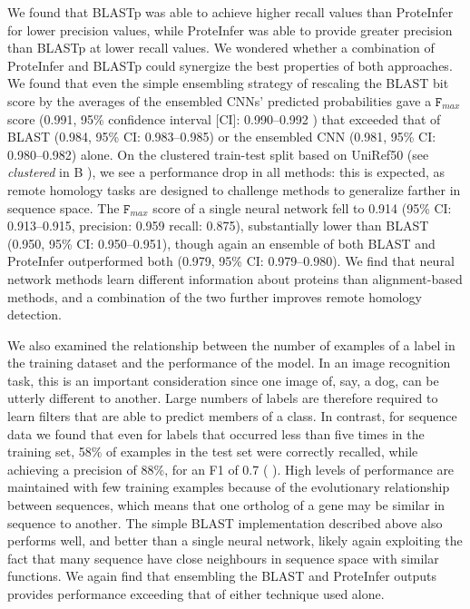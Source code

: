 We found that BLASTp was able to achieve higher recall values than ProteInfer for lower precision values, while ProteInfer was able to provide greater precision than BLASTp at lower recall values. We wondered whether a combination of ProteInfer and BLASTp could synergize the best properties of both approaches. We found that even the simple ensembling strategy of rescaling the BLAST bit score by the averages of the ensembled CNNs' predicted probabilities gave a $\texttt{F}_{max}$ score (0.991, 95\% confidence interval [CI]: 0.990--0.992 ) that exceeded that of BLAST (0.984, 95\% CI: 0.983--0.985) or the ensembled CNN (0.981, 95\% CI: 0.980--0.982) alone. 
On the clustered train-test split based on UniRef50 (see \textit{clustered} in B%
), we see a performance drop in all methods: this is expected, as remote homology tasks are designed to challenge methods to generalize farther in sequence space. The $\texttt{F}_{max}$ score of a single neural network fell to 0.914 (95\% CI: 0.913--0.915, precision: 0.959 recall: 0.875), substantially lower than BLAST (0.950, 95\% CI: 0.950--0.951), though again an ensemble of both BLAST and ProteInfer outperformed both (0.979, 95\% CI: 0.979--0.980). We find that neural network methods learn different information about proteins than alignment-based methods, and a combination of the two further improves remote homology detection. 



We also examined the relationship between the number of examples of a label in the training dataset and the performance of the model. In an image recognition task, this is an important consideration since one image of, say, a dog, can be utterly different to another. Large numbers of labels are therefore required to learn filters that are able to predict members of a class. In contrast, for sequence data we found that even for labels that occurred less than five times in the training set, 58\% of examples in the test set were correctly recalled, while achieving a precision of 88\%, for an F1 of 0.7 (%
). High levels of performance are maintained with few training examples because of the evolutionary relationship between sequences, which means that one ortholog of a gene may be similar in sequence to another. The simple BLAST implementation described above also performs well, and better than a single neural network, likely again exploiting the fact that many sequence have close neighbours in sequence space with similar functions. We again find that ensembling the BLAST and ProteInfer outputs provides performance exceeding that of either technique used alone.

